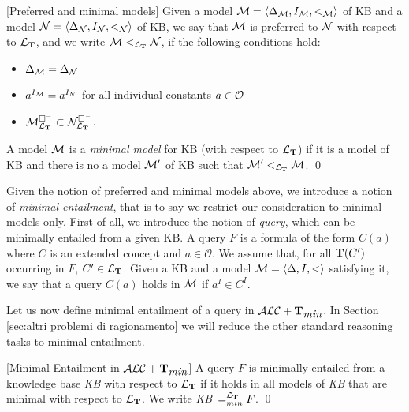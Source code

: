 \documentclass[a4paper, 11pt, oneside]{duthesis}
\newcommand{\tip}{{\bf T}}
\newcommand{\alctmin}{\mathcal{ALC}+\tip_{\mbox{\em min}}}
\newcommand{\bbox}{\square}
\newcommand{\sx} {\langle}
\newcommand{\dx} {\rangle}
\newcommand{\ellet} {\mathcal{L}_{\bf T}}
\newcommand{\emme} {\begin{mathcal}M\end{mathcal}}
\newcommand{\enne} {\begin{mathcal}N\end{mathcal}}
\newenvironment{definition}
{\begin{defi} \rm}{\qed \end{defi}}
\newenvironment{definition}
{\begin{defi} \rm}{\qed \end{defi}}
\newtheorem{definition}{Definition}
\newcounter{posu}
\newtheorem{definition}[posu]{Definition}
\begin{document}
\begin{definition}[Preferred and minimal models]\label{def preferred and minimal models}
Given a model $\emme=\sx \Delta_{\emme}, I_{\emme}, <_{\emme} \dx$ of KB and  a model $\enne=\sx \Delta_{\enne}, I_{\enne}, <_{\enne} \dx$ of KB, we say that $\emme$ is preferred to $\enne$ with respect to ${\ellet}$, and we write $\emme <_{\ellet} \enne$, if the following conditions hold:

\begin{itemize}
\item $\Delta_{\emme}=\Delta_{\enne}$
\item $a^{I_{\emme}}=a^{I_{\enne}}$ for all individual constants $a \in \begin{mathcal}O\end{mathcal}$
\item $\emme^{\bbox^-}_{\ellet} \subset \enne^{\bbox^-}_{\ellet}$.
\end{itemize}

\noindent A model $\emme$ is a \emph{minimal model} for KB (with respect to ${\ellet}$) if it is a model of KB and there is no a model $\emme'$ of KB such that $\emme' <_{\ellet} \emme$.
\end{definition}

\noindent Given the notion of preferred and minimal models above, we introduce a notion of \emph{minimal entailment}, that is to say we restrict our consideration to minimal models only.
First of all, we introduce the notion of \emph{query}, which can be minimally entailed from a given KB.
A query $F$ is  a formula of the form $C(a)$ where $C$ is an extended concept and $a \in \mathcal{O}$.
We assume that, for all $\tip(C')$ occurring in $F$, $C' \in \ellet$.
Given a KB and a model $\emme=\sx \Delta, I, < \dx$ satisfying it, we say that a query $C(a)$ holds in $\emme$ if $a^I \in C^I$.

Let us now define minimal entailment of a query in $\alctmin$.
In Section \ref{sec:altri problemi di ragionamento} we will reduce the other standard reasoning tasks to minimal entailment.

\begin{definition}[Minimal Entailment in $\alctmin$]\label{LogicalConsequenceALCTMIN}
A query $F$  is minimally entailed from a knowledge base \emph{KB} with respect to ${\ellet}$ if it holds in all models of \emph{KB} that are minimal with respect to ${\ellet}$.
We write \emph{KB} $\models_{min}^{\ellet} F$.
\end{definition}
\end{document}
